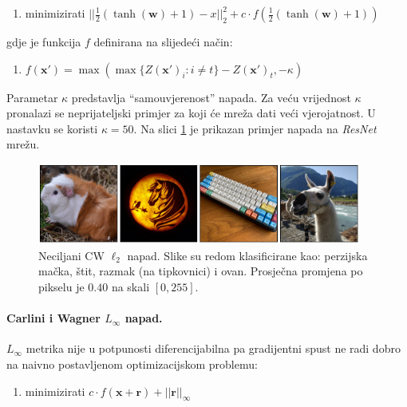 \documentclass[utf8, diplomski]{fer}
\begin{document}
\begin{enumerate}[noitemsep, label={}]
  \item minimizirati $||\frac{1}{2}(\tanh(\boldsymbol{w}) + 1) - x||_{2}^{2} + c \cdot f(\frac{1}{2}(\tanh(\boldsymbol{w}) + 1))$
\end{enumerate}

gdje je funkcija $f$ definirana na slijedeći način:

\begin{enumerate}[noitemsep, label={}]
  \item $f(\boldsymbol{x}') = \max(\max\{Z(\boldsymbol{x}')_{i} : i \neq t\} - Z(\boldsymbol{x}')_{t}, -\kappa)$
\end{enumerate}

Parametar $\kappa$ predstavlja ``samouvjerenost'' napada. Za veću vrijednost $\kappa$ pronalazi se neprijateljski primjer za koji će mreža dati veći vjerojatnost. U nastavku se koristi $\kappa = 50$. Na slici \ref{fig:carlini_l2} je prikazan primjer napada na \textit{ResNet} mrežu.

\begin{figure}[H]
\centering
\includegraphics[width=0.95\textwidth,keepaspectratio]{img/results/carlini_l2.png}
\caption{Neciljani CW $\ell_{2}$ napad. Slike su redom klasificirane kao: perzijska mačka, štit, razmak (na tipkovnici) i ovan. Prosječna promjena po pikselu je $0.40$ na skali $[0, 255]$.}
\label{fig:carlini_l2}
\end{figure}


\paragraph{Carlini i Wagner $L_{\infty}$ napad.} 
$L_{\infty}$ metrika nije u potpunosti diferencijabilna pa gradijentni spust ne radi dobro na naivno postavljenom optimizacijskom problemu:

\begin{enumerate}[noitemsep, label={}]
  \item minimizirati $c \cdot f(\boldsymbol{x} + \boldsymbol{r}) + ||\boldsymbol{r}||_{\infty}$
\end{enumerate}
\end{document}
